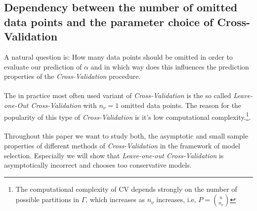 \documentclass[Research_Module_ES.tex]{subfiles}
\begin{document}
\subsection{Dependency between the number of omitted data points and the  parameter choice of Cross-Validation}
A natural question is: How many data points should be omitted in order to evaluate our prediction of $\alpha$ and in which way does this influences the prediction properties of the \textit{Cross-Validation} procedure.\\
\\
The in practice most often used variant of \textit{Cross-Validation} is the so called \textit{ Leave-one-Out Cross-Validation} with $n_\nu=1$ omitted data points. The reason for the popularity of this type of \textit{Cross-Validation} is it's low computational complexity.\footnote{The computational complexity of CV depends strongly on the number of possible partitions in $\Gamma$, which increases as $n_\nu$ increases, i.e,
$P=\binom{n}{n_\nu}$}.\\
\\
Throughout this paper we want to study both, the asymptotic and small sample properties of different methods of \textit{Cross-Validation} in the framework of model selection. Especially we will show that \textit{ Leave-one-out Cross-Validation} is asymptotically incorrect and chooses too conservative models.
\end{document}
